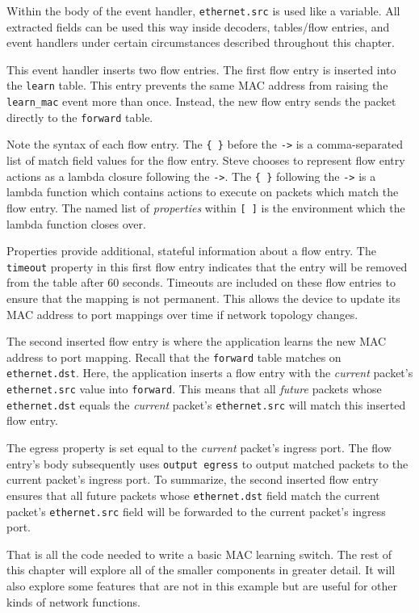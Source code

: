 Within the body of the event handler, \texttt{ethernet.src} is used like a variable. All extracted fields can be used this way inside decoders, tables/flow entries, and event handlers under certain circumstances described throughout this chapter.

This event handler inserts two flow entries.
The first flow entry is inserted into
the \texttt{learn} table. 
This entry prevents the same MAC address from raising the
\texttt{learn\_mac} event more than once.
Instead, the new flow entry sends the packet directly to the \texttt{forward} 
table.

Note the syntax of each flow entry. The \texttt{\{ \}} before the \texttt{->} is a comma-separated list of match field values for the flow entry. Steve chooses to represent flow entry actions as a lambda closure following the \texttt{->}. The \texttt{\{ \}} following the \texttt{->} is a lambda function which contains actions to execute on packets which match the flow entry. The named list of \emph{properties} within \texttt{[ ]} is the environment which the lambda function closes over.

Properties provide additional, stateful information about a flow entry. The \texttt{timeout} property in this first flow entry indicates that the entry will be removed from the table after 60 seconds. Timeouts are included on these flow entries to ensure that the
mapping is not permanent. This allows the device to update its
MAC address to port mappings over time if network topology changes.

The second inserted flow entry is where the application
learns the new MAC address to port mapping.
Recall that the \texttt{forward} table matches on \texttt{ethernet.dst}.
Here, the application inserts a flow entry with the \textit{current} packet's 
\texttt{ethernet.src} value into \texttt{forward}.
This means that all \textit{future} packets whose
\texttt{ethernet.dst} equals the \textit{current} packet's \texttt{ethernet.src}
will match this inserted flow entry. 

The egress property is set equal to the
\textit{current} packet's ingress port. The flow entry's body subsequently uses
\texttt{output egress} to output matched packets to the current packet's ingress port.
To summarize, the second inserted flow entry ensures that all future packets whose
\texttt{ethernet.dst} field match the current packet's \texttt{ethernet.src}
field will be forwarded to the current packet's ingress port. 

That is all the code needed to write a basic MAC learning switch.
The rest of this chapter will explore all of the smaller components in greater detail. It will also explore some features that are not in this example but are useful for other kinds of network functions.

